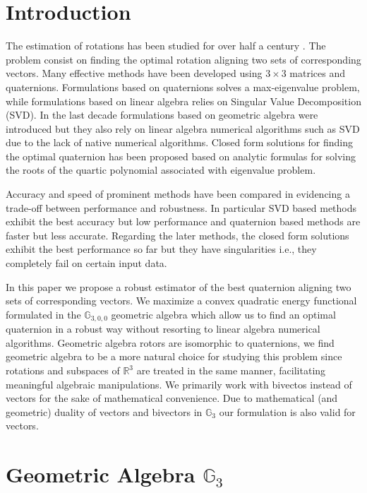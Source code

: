 \documentclass{birkjour}
\numberwithin{equation}{section}
\begin{document}
\section{Introduction}

\indent The estimation of rotations has been studied for over half a century \cite{Wahba1965}. The problem consist on finding the optimal rotation aligning two sets of corresponding vectors. Many effective methods have been developed \cite{Arun1987, Horn1987, Mortari1996, Shuster1981, Yang2015} using $3\times3$ matrices and quaternions. Formulations based on quaternions solves a max-eigenvalue problem, while formulations based on linear algebra relies on Singular Value Decomposition (SVD). In the last decade formulations based on geometric algebra \cite{Perwass2009, Dorst2011} were introduced but they also rely on linear algebra numerical algorithms such as SVD due to the lack of native numerical algorithms. Closed form solutions for finding the optimal quaternion has been proposed \cite{Yang2013, Wu2017, Wu2018FA3R, Wu2018FS3R} based on analytic formulas for solving the roots of the quartic polynomial associated with eigenvalue problem.

Accuracy and speed of prominent methods have been compared in  \cite{Eggert1997, Markley1999, Wu2017} evidencing a trade-off between performance and robustness. In particular SVD based methods exhibit the best accuracy but low performance and quaternion based methods are faster but less accurate. Regarding the later methods, the closed form solutions exhibit the best performance so far but they have singularities i.e., they completely fail on certain input data.

In this paper we propose a robust estimator of the best quaternion aligning two sets of corresponding vectors. We maximize a convex quadratic energy functional formulated in the $\mathbb{G}_{3,0,0}$ geometric algebra which allow us to find an optimal quaternion in a robust way without resorting to linear algebra numerical algorithms. Geometric algebra rotors are isomorphic to quaternions, we find geometric algebra to be a more natural choice for studying this problem since rotations and subspaces of $\mathbb R^3$ are treated in the same manner, facilitating meaningful algebraic manipulations. We primarily work with bivectos instead of vectors for the sake of mathematical convenience. Due to mathematical (and geometric) duality of vectors and bivectors in $\mathbb{G}_3$ our formulation is also valid for vectors.

\section{Geometric Algebra $\mathbb{G}_3$}
\end{document}
